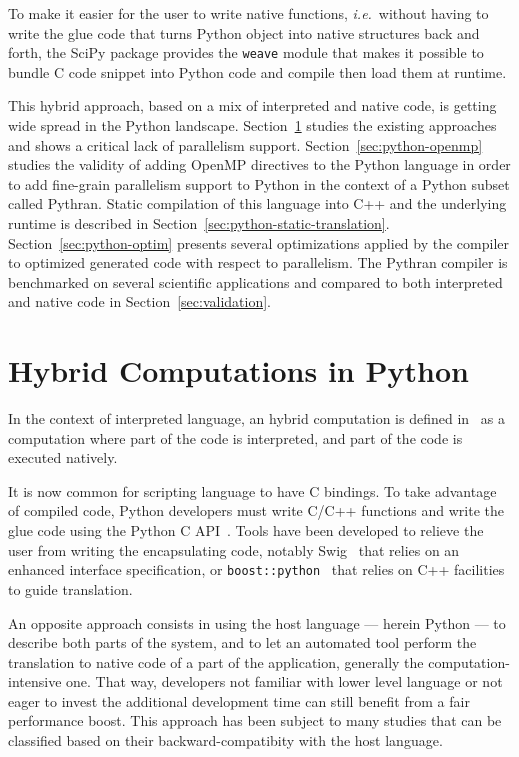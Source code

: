 \documentclass{llncs}
\begin{document}
To make it easier for the user to write native functions, \emph{i.e.}\ without
having to write the glue code that turns Python object into native structures
back and forth, the SciPy package provides the \texttt{weave} module that makes
it possible to bundle C code snippet into Python code and compile then load them
at runtime.

This hybrid approach, based on a mix of interpreted and native code, is getting
wide spread in the Python landscape. Section~\ref{sec:python-hybrid} studies the
existing approaches and shows a critical lack of parallelism support.
Section~\ref{sec:python-openmp} studies the validity of adding OpenMP directives to the
Python language in order to add fine-grain parallelism support to Python in the
context of a Python subset called Pythran. Static compilation of this language
into C++ and the underlying runtime is described in
Section~\ref{sec:python-static-translation}.
Section~\ref{sec:python-optim} presents several optimizations applied by the compiler to
optimized generated code with respect to parallelism. The Pythran compiler is
benchmarked on several scientific applications and compared to both interpreted
and native code in Section~\ref{sec:validation}.

\section{Hybrid Computations in Python}\label{sec:python-hybrid}

In the context of interpreted language, an hybrid computation is defined
in~\cite{dongara2007} as a computation where part of the code is interpreted,
and part of the code is executed natively.

It is now common for scripting language to have C bindings. To take advantage of
compiled code, Python developers must write C/C++ functions and write the glue
code using the Python C API~\cite{pythoncapi}. Tools have been developed to
relieve the user from writing the encapsulating code, notably
Swig~\cite{swig2003} that relies on an enhanced interface specification, or
\texttt{boost::python}~\cite{boostpython2007} that relies on C++ facilities to
guide translation.

An opposite approach consists in using the host language --- herein Python ---
to describe both parts of the system, and to let an automated tool perform the
translation to native code of a part of the application, generally the
computation-intensive one. That way, developers not familiar with lower level
language or not eager to invest the additional development time can still
benefit from a fair performance boost. This approach has been subject to many
studies that can be classified based on their backward-compatibity with the host
language.
\end{document}
